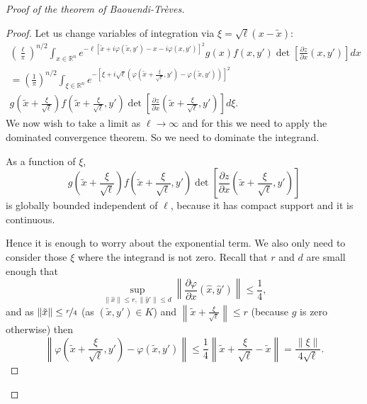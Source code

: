 \documentclass[12pt,openany]{book}
\newcommand{\snorm}[1]{\lVert {#1} \rVert}
\newcommand{\norm}[1]{\left\lVert {#1} \right\rVert}
\newcommand{\R}{{\mathbb{R}}}
\theoremstyle{plain}
\theoremstyle{remark}
\theoremstyle{definition}
\theoremstyle{exercise}
\theoremstyle{example}
\begin{document}
\begin{proof}[Proof of the theorem of Baouendi-Tr{\`e}ves]
\begin{proof}
Let us change variables of integration via $\xi = \sqrt{\ell} ( x-\tilde{x})$:
\begin{multline*}
{\left(\frac{\ell}{\pi}\right)}^{n/2}
\int_{x \in \R^n}
e^{  -\ell [\tilde{x}+i\varphi(\tilde{x},y') - x-i\varphi(x,y')]^2 } g(x) f(x,y')
\det \left[\frac{\partial z}{\partial x}(x,y')\right] dx
\\
=
{\left(\frac{1}{\pi}\right)}^{n/2}
\int_{\xi \in \R^n}
e^{-{\left[\xi +
i\sqrt{\ell}\left(\varphi\left(\tilde{x}+\frac{\xi}{\sqrt{\ell}},y'\right) -
\varphi(\tilde{x},y')\right)\right]}^2}
\\
g\left(\tilde{x}+\frac{\xi}{\sqrt{\ell}}\right)
f\left(\tilde{x}+\frac{\xi}{\sqrt{\ell}},y'\right)
\det \left[\frac{\partial z}{\partial
x}\left(\tilde{x}+\frac{\xi}{\sqrt{\ell}},y'\right)\right] d\xi .
\end{multline*}
We now wish to take a limit as $\ell \to \infty$ and for this we need to apply
the dominated convergence theorem.  So we need to dominate the integrand.

As a function of $\xi$,
\begin{equation*}
g\left(\tilde{x}+\frac{\xi}{\sqrt{\ell}}\right)
f\left(\tilde{x}+\frac{\xi}{\sqrt{\ell}},y'\right)
\det \left[\frac{\partial z}{\partial
x}\left(\tilde{x}+\frac{\xi}{\sqrt{\ell}},y'\right)\right]
\end{equation*}
is globally bounded independent of $\ell$, because it has compact support and it is continuous.

Hence it is enough to worry about the exponential term.
We also only need to consider those $\xi$ where the integrand is not zero.
Recall that $r$ and $d$ are small enough that
\begin{equation*}
\sup_{\snorm{\hat{x}} \leq r, \snorm{\hat{y}'} \leq d}
\norm{\frac{ \partial \varphi}{\partial  x}(\hat{x},\hat{y}')} \leq \frac{1}{4} ,
\end{equation*}
and as $\snorm{\tilde{x}} \leq \nicefrac{r}{4}$ (as
$(\tilde{x},y') \in K$) and
$\norm{\tilde{x}+\frac{\xi}{\sqrt{\ell}}} \leq r$ (because $g$ is
zero otherwise) then
\begin{equation*}
\norm{\varphi\left(\tilde{x}+\frac{\xi}{\sqrt{\ell}},y'\right) -
\varphi(\tilde{x},y')}
\leq \frac{1}{4} \norm{\tilde{x}+\frac{\xi}{\sqrt{\ell}}-\tilde{x}} =
\frac{\snorm{\xi}}{4 \sqrt{\ell}} .
\end{equation*}


\end{proof}
\end{proof}
\end{document}
